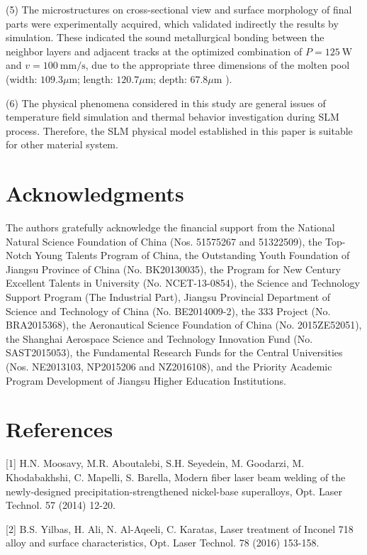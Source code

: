 \documentclass[10pt]{article}
\begin{document}
(5) The microstructures on cross-sectional view and surface morphology of final parts were experimentally acquired, which validated indirectly the results by simulation. These indicated the sound metallurgical bonding between the neighbor layers and adjacent tracks at the optimized combination of $P=125 \mathrm{~W}$ and $v=100 \mathrm{~mm} / \mathrm{s}$, due to the appropriate three dimensions of the molten pool (width: $109.3 \mu \mathrm{m}$; length: $120.7 \mu \mathrm{m}$; depth: $67.8 \mu \mathrm{m}$ ).

(6) The physical phenomena considered in this study are general issues of temperature field simulation and thermal behavior investigation during SLM process. Therefore, the SLM physical model established in this paper is suitable for other material system.

\section*{Acknowledgments}
The authors gratefully acknowledge the financial support from the National Natural Science Foundation of China (Nos. 51575267 and 51322509), the Top-Notch Young Talents Program of China, the Outstanding Youth Foundation of Jiangsu Province of China (No. BK20130035), the Program for New Century Excellent Talents in University (No. NCET-13-0854), the Science and Technology Support Program (The Industrial Part), Jiangsu Provincial Department of Science and Technology of China (No. BE2014009-2), the 333 Project (No. BRA2015368), the Aeronautical Science Foundation of China (No. 2015ZE52051), the Shanghai Aerospace Science and Technology Innovation Fund (No. SAST2015053), the Fundamental Research Funds for the Central Universities (Nos. NE2013103, NP2015206 and NZ2016108), and the Priority Academic Program Development of Jiangsu Higher Education Institutions.

\section*{References}
[1] H.N. Moosavy, M.R. Aboutalebi, S.H. Seyedein, M. Goodarzi, M. Khodabakhshi, C. Mapelli, S. Barella, Modern fiber laser beam welding of the newly-designed precipitation-strengthened nickel-base superalloys, Opt. Laser Technol. 57 (2014) 12-20.

[2] B.S. Yilbas, H. Ali, N. Al-Aqeeli, C. Karatas, Laser treatment of Inconel 718 alloy and surface characteristics, Opt. Laser Technol. 78 (2016) 153-158.
\end{document}
